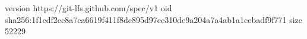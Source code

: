 version https://git-lfs.github.com/spec/v1
oid sha256:1f1cdf2ec8a7ca6619f411f8dc895d97cc310de9a204a7a4ab1a1cebadf9f771
size 52229
